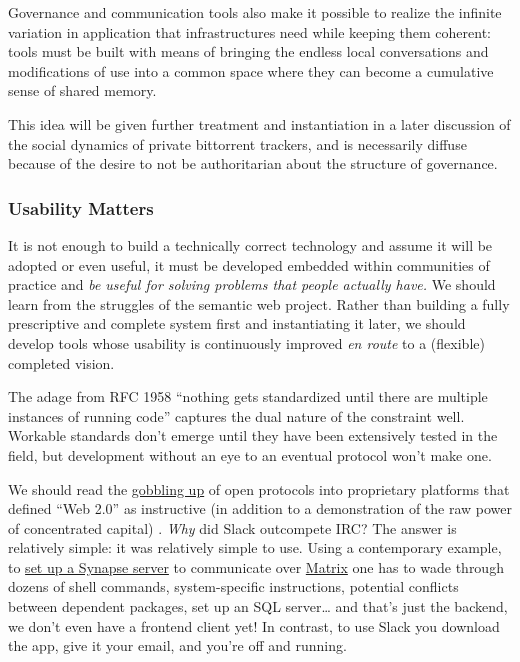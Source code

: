 \documentclass[10pt]{article}
\begin{document}
\begin{multicols}{2}
Governance and communication tools also make it possible to realize the
infinite variation in application that infrastructures need while
keeping them coherent: tools must be built with means of bringing the
endless local conversations and modifications of use into a common space
where they can become a cumulative sense of shared memory.

This idea will be given further treatment and instantiation in a later
discussion of the social dynamics of private bittorrent trackers, and is
necessarily diffuse because of the desire to not be authoritarian about
the structure of governance.

\hypertarget{usability-matters}{%
\subsubsection{Usability Matters}\label{usability-matters}}

It is not enough to build a technically correct technology and assume it
will be adopted or even useful, it must be developed embedded within
communities of practice and \emph{be useful for solving problems that
people actually have.} We should learn from the struggles of the
semantic web project. Rather than building a fully prescriptive and
complete system first and instantiating it later, we should develop
tools whose usability is continuously improved \emph{en route} to a
(flexible) completed vision.

The adage from RFC 1958 ``nothing gets standardized until there are
multiple instances of running code'' \cite{carpenterRFC1958Architectural1996}  captures the dual nature of the
constraint well. Workable standards don't emerge until they have been
extensively tested in the field, but development without an eye to an
eventual protocol won't make one.

We should read the
\href{https://en.wikipedia.org/wiki/Embrace,_extend,_and_extinguish}{gobbling
up} of open protocols into proprietary platforms that defined ``Web
2.0'' as instructive (in addition to a demonstration of the raw power of
concentrated capital) \cite{markoffTomorrowWorldWide1996} .
\emph{Why} did Slack outcompete IRC? The answer is relatively simple: it
was relatively simple to use. Using a contemporary example, to
\href{https://matrix-org.github.io/synapse/latest/setup/installation.html}{set
up a Synapse server} to communicate over
\href{https://matrix.org/docs/spec/}{Matrix} one has to wade through
dozens of shell commands, system-specific instructions, potential
conflicts between dependent packages, set up an SQL server\ldots{} and
that's just the backend, we don't even have a frontend client yet! In
contrast, to use Slack you download the app, give it your email, and
you're off and running.


\end{multicols}
\end{document}
